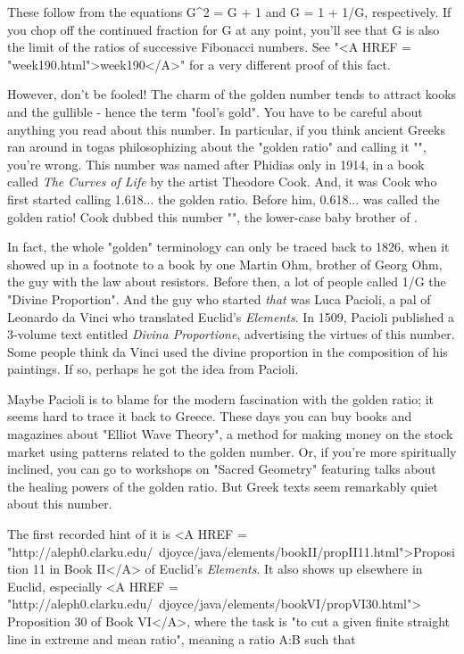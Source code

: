 These follow from the equations G^{2} = G + 1 and G = 1 + 1/G, respectively.
If you chop off the continued fraction for G at any point, you'll see that 
G is also the limit of the ratios of successive Fibonacci numbers.   See 
"<A HREF = "week190.html">week190</A>" for a very different proof of this fact.

However, don't be fooled!  The charm of the golden number tends to attract  
kooks and the gullible - hence the term "fool's gold".  You have to be 
careful about anything you read about this number.  In particular, if you 
think ancient Greeks ran around in togas philosophizing about the "golden 
ratio" and calling it "\Phi ", you're wrong.  This number was named \Phi  
after Phidias only in 1914, in a book called \emph{The Curves of Life} 
by the artist Theodore Cook.  And, it was Cook who first started calling 
1.618...  the golden ratio.  Before him, 0.618... was called the golden ratio!  Cook dubbed this number "\phi ", the lower-case baby brother of \Phi .  

In fact, the whole "golden" terminology can only be traced back to 
1826, when it showed up in a footnote to a book by one Martin Ohm, brother of 
Georg Ohm, the guy with the law about resistors.  Before then, a lot of
people called 1/G the "Divine Proportion".  And the guy who started
\emph{that} 
was Luca Pacioli, a pal of Leonardo da Vinci who translated Euclid's 
\emph{Elements}.  In 1509, Pacioli published a 3-volume text entitled 
\emph{Divina Proportione}, 
advertising the virtues of this number.  Some people think 
da Vinci used the divine proportion in the composition of his paintings.  
If so, perhaps he got the idea from Pacioli.

Maybe Pacioli is to blame for the modern fascination with the golden
ratio; it seems hard to trace it back to Greece.  These days you can buy 
books and magazines about "Elliot Wave Theory", a method for making money 
on the stock market using patterns related to the golden number.  Or, if
you're more spiritually inclined, you can go to workshops on "Sacred 
Geometry" featuring talks about the healing powers of the golden ratio.  
But Greek texts seem remarkably quiet about this number.  

The first recorded hint of it is <A HREF = "http://aleph0.clarku.edu/~djoyce/java/elements/bookII/propII11.html">Proposition 11 in Book II</A> of Euclid's 
\emph{Elements}.  It also shows up elsewhere in Euclid, especially 
<A HREF = "http://aleph0.clarku.edu/~djoyce/java/elements/bookVI/propVI30.html">
Proposition 
30 of Book VI</A>, where the task is "to cut a given finite straight line in
extreme and mean ratio", meaning a ratio A:B such that


